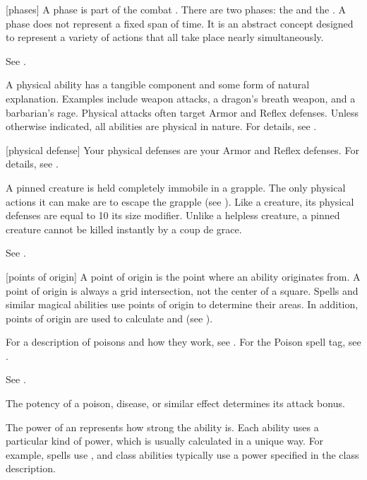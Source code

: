 [phases] A phase is part of the combat .
There are two phases: the  and the .
A phase does not represent a fixed span of time.
It is an abstract concept designed to represent a variety of actions that all take place nearly simultaneously.

 See .

 A physical ability has a tangible component and some form of natural explanation.
Examples include weapon attacks, a dragon's breath weapon, and a barbarian's rage.
Physical attacks often target Armor and Reflex defenses.
Unless otherwise indicated, all abilities are physical in nature.
For details, see .

[physical defense] Your physical defenses are your Armor and Reflex defenses.
For details, see .

 A pinned creature is held completely immobile in a grapple.
The only physical actions it can make are to escape the grapple (see ).
Like a  creature, its physical defenses are equal to 10 \add its size modifier.
Unlike a helpless creature, a pinned creature cannot be killed instantly by a coup de grace.

 See .

[points of origin] A point of origin is the point where an ability originates from.
A point of origin is always a grid intersection, not the center of a square.
Spells and similar magical abilities use points of origin to determine their areas.
In addition, points of origin are used to calculate  and  (see ).

 For a description of poisons and how they work, see . For the Poison spell tag, see .

 See .

 The potency of a poison, disease, or similar effect determines its attack bonus.

 The power of an  represents how strong the ability is.
Each ability uses a particular kind of power, which is usually calculated in a unique way.
For example, spells use , and class abilities typically use a power specified in the class description.

